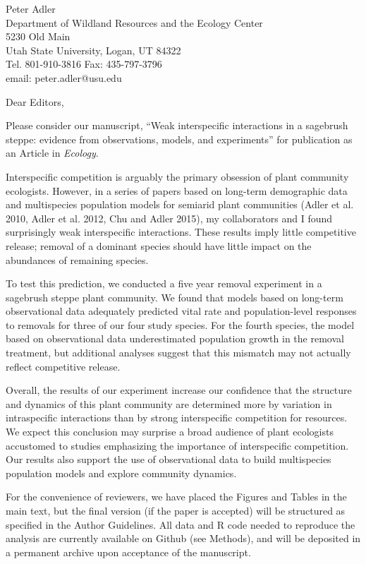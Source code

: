 \documentclass[11pt]{letter}
\begin{document}
Peter Adler\\
 Department of Wildland Resources and the Ecology Center\\
 5230 Old Main\\
 Utah State University, Logan, UT 84322\\
 Tel. 801-910-3816 \quad Fax:  435-797-3796\\
 email: peter.adler@usu.edu
 
 \medskip

Dear Editors,

Please consider our manuscript, ``Weak interspecific interactions in a sagebrush steppe: evidence from observations, models, and experiments''
for publication as an Article in \textit{Ecology}.

Interspecific competition is arguably the primary obsession of plant community ecologists. However, in a series of papers based on long-term demographic data and multispecies population models for semiarid plant communities (Adler et al. 2010, Adler et al. 2012, Chu and Adler 2015), my collaborators and I found surprisingly weak interspecific interactions. These results imply little competitive release; removal of a dominant species should have little impact on the abundances of remaining species.

To test this prediction, we conducted a five year removal experiment in a sagebrush steppe plant community. We found that models based on long-term observational data adequately 
predicted vital rate and population-level responses to removals for three of our four study species. For the fourth species, the model based on observational data underestimated population growth in the removal treatment, but additional analyses suggest that this mismatch may not actually reflect competitive release. 
 
Overall, the results of our experiment increase our confidence that the structure and dynamics of this plant community are determined more by variation in intraspecific interactions than by strong interspecific competition for resources. We expect this conclusion may surprise a broad audience of plant ecologists accustomed to studies emphasizing the importance of interspecific competition. Our results also support the use of observational data to build multispecies population models and explore community dynamics.

For the convenience of reviewers, we have placed the Figures and Tables in the main text, but the final 
version (if the paper is accepted) will be structured as specified in the Author Guidelines. All data and R code needed
to reproduce the analysis are currently 
available on Github (see Methods), and will be deposited in a permanent archive upon acceptance of the manuscript.
\end{document}

